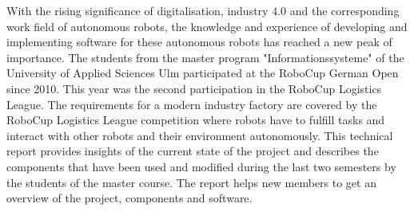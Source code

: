 With the rising significance of digitalisation, industry 4.0 and the corresponding work field of autonomous robots, the knowledge and experience of developing and implementing software for these autonomous robots has reached a new peak of importance. The students from the master program "Informationssysteme" of the University of Applied Sciences Ulm participated at the RoboCup German Open since 2010. This year was the second participation in the RoboCup Logistics League. The requirements for a modern industry factory are covered by the RoboCup Logistics League competition where robots have to fulfill tasks and interact with other robots and their environment autonomously. This technical report provides insights of the current state of the project and describes the components that have been used and modified during the last two semesters by the students of the master course. The report helps new members to get an overview of the project, components and software.
